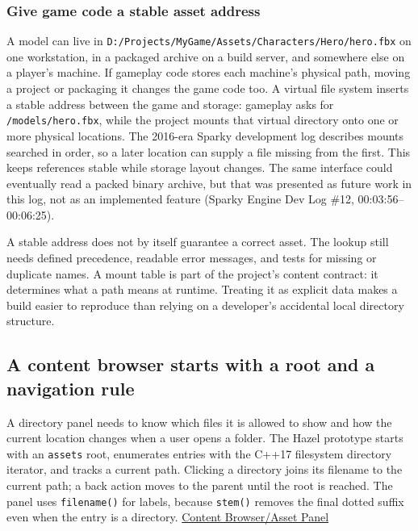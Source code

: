 \subsubsection{Give game code a stable asset address}\label{06-engine-ii-ch027-give-game-code-a-stable-asset-address}

A model can live in \texttt{D:/Projects/MyGame/Assets/Characters/Hero/hero.fbx} on one workstation, in a packaged archive on a build server, and somewhere else on a player's machine. If gameplay code stores each machine's physical path, moving a project or packaging it changes the game code too. A virtual file system inserts a stable address between the game and storage: gameplay asks for \texttt{/models/hero.fbx}, while the project mounts that virtual directory onto one or more physical locations. The 2016-era Sparky development log describes mounts searched in order, so a later location can supply a file missing from the first. This keeps references stable while storage layout changes. The same interface could eventually read a packed binary archive, but that was presented as future work in this log, not as an implemented feature (Sparky Engine Dev Log \#12, 00:03:56--00:06:25).

A stable address does not by itself guarantee a correct asset. The lookup still needs defined precedence, readable error messages, and tests for missing or duplicate names. A mount table is part of the project's content contract: it determines what a path means at runtime. Treating it as explicit data makes a build easier to reproduce than relying on a developer's accidental local directory structure.

\subsection{A content browser starts with a root and a navigation rule}\label{06-engine-ii-ch027-a-content-browser-starts-with-a-root-and-a-navigation-rule}

A directory panel needs to know which files it is allowed to show and how the current location changes when a user opens a folder. The Hazel prototype starts with an \texttt{assets} root, enumerates entries with the C++17 filesystem directory iterator, and tracks a current path. Clicking a directory joins its filename to the current path; a back action moves to the parent until the root is reached. The panel uses \texttt{filename()} for labels, because \texttt{stem()} removes the final dotted suffix even when the entry is a directory. \href{https://www.youtube.com/watch?v=aBuPmOGC7hU}{Content Browser/Asset Panel}

